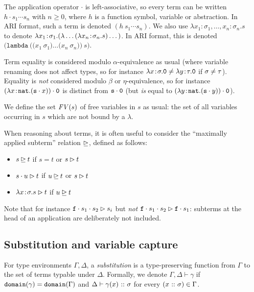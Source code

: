 The application operator $\cdot$ is left-associative, so every term can be written $h \cdot s_1
\cdots s_n$ with $n \geq 0$, where $h$ is a function symbol, variable or abstraction.
In ARI format, such a term is denoted $(h\ s_1 \cdots s_n)$.
We also use $\lambda x_1\!:\!\sigma_1,\dots,x_n\!:\!\sigma_n.s$ to denote
$\lambda x_1\!:\!\sigma_1.(\lambda \dots (\lambda x_n\!:\!\sigma_n.s)\dots)$.  In ARI format, this is denoted
$\mathtt{(lambda\ ((}x_1\ \sigma_1\mathtt{)} \dots \mathtt{(}x_n\ \sigma_n\mathtt{))}\ s\mathtt{)}$.

Term equality is considered modulo $\alpha$-equivalence as usual (where variable renaming does not
affect types, so for instance $\lambda x\!:\!\sigma.\mathtt{0} \neq \lambda y\!:\!\tau.\mathtt{0}$ if
$\sigma \neq \tau$).  Equality is \emph{not} considered modulo $\beta$ or $\eta$-equivalence, so
for instance $(\lambda x\!:\!\mathtt{nat}.(\mathtt{s} \cdot x)) \cdot \mathtt{0}$ is distinct from
$\mathtt{s} \cdot \mathtt{0}$ (but \emph{is} equal to
$(\lambda y\!:\!\mathtt{nat}.(\mathtt{s} \cdot y)) \cdot \mathtt{0}$).

We define the set $\mathit{FV}(s)$ of free variables in $s$ as usual: the set of all variables occurring in
$s$ which are not bound by a $\lambda$.

When reasoning about terms, it is often useful to consider the ``maximally applied subterm''
relation $\unrhd$, defined as follows:
\begin{itemize}
\item $s \unrhd t$ if $s = t$ or $s \rhd t$
\item $s \cdot u \rhd t$ if $u \unrhd t$ or $s \rhd t$
\item $\lambda x\!:\!\sigma.s \rhd t$ if $u \unrhd t$
\end{itemize}
Note that for instance $\mathtt{f} \cdot s_1 \cdot s_2 \rhd s_i$ but \emph{not} $\mathtt{f} \cdot 
s_1 \cdot s_2 \rhd \mathtt{f} \cdot s_1$: subterms at the head of an application are deliberately not
included.

\subsection{Substitution and variable capture}

For type environments $\Gamma,\Delta$, a \emph{substitution} is a type-preserving function from
$\Gamma$ to the set of terms typable under $\Delta$.  Formally, we denote $\Gamma, \Delta \vdash
\gamma$ if $\mathtt{domain}(\gamma) = \mathtt{domain}(\Gamma)$ and $\Delta \vdash \gamma(x) \ \mathtt{::}\  \sigma$
for every $(x \ \mathtt{::}\  \sigma) \in \Gamma$.

